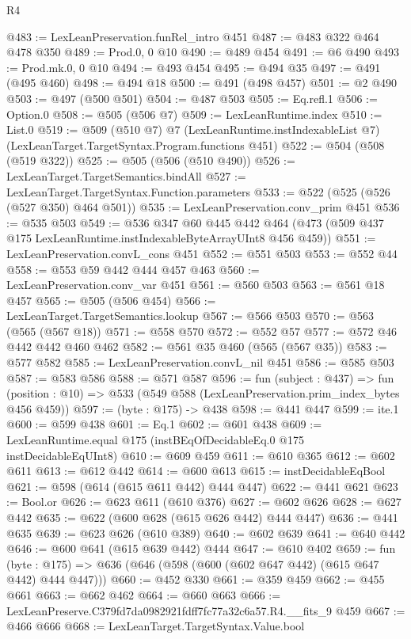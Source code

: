 \begin{lexlean}{R4}
\begin{coremodule}
@483 := LexLeanPreservation.funRel_intro @451
@487 := @483 @322 @464 @478 @350
@489 := Prod.{0, 0} @10
@490 := @489 @454
@491 := @6 @490
@493 := Prod.mk.{0, 0} @10
@494 := @493 @454
@495 := @494 @35
@497 := @491 (@495 @460)
@498 := @494 @18
@500 := @491 (@498 @457)
@501 := @2 @490
@503 := @497 (@500 @501)
@504 := @487 @503
@505 := Eq.refl.{1}
@506 := Option.{0}
@508 := @505 (@506 @7)
@509 := LexLeanRuntime.index
@510 := List.{0}
@519 := @509
    (@510 @7)
    @7
    (LexLeanRuntime.instIndexableList @7)
    (LexLeanTarget.TargetSyntax.Program.functions @451)
@522 := @504 (@508 (@519 @322))
@525 := @505 (@506 (@510 @490))
@526 := LexLeanTarget.TargetSemantics.bindAll
@527 := LexLeanTarget.TargetSyntax.Function.parameters
@533 := @522 (@525 (@526 (@527 @350) @464 @501))
@535 := LexLeanPreservation.conv_prim @451
@536 := @535 @503
@549 := @536
    @347
    @60
    @445
    @442
    @464
    (@473 (@509 @437 @175 LexLeanRuntime.instIndexableByteArrayUInt8 @456 @459))
@551 := LexLeanPreservation.convL_cons @451
@552 := @551 @503
@553 := @552 @44
@558 := @553 @59 @442 @444 @457 @463
@560 := LexLeanPreservation.conv_var @451
@561 := @560 @503
@563 := @561 @18 @457
@565 := @505 (@506 @454)
@566 := LexLeanTarget.TargetSemantics.lookup
@567 := @566 @503
@570 := @563 (@565 (@567 @18))
@571 := @558 @570
@572 := @552 @57
@577 := @572 @46 @442 @442 @460 @462
@582 := @561 @35 @460 (@565 (@567 @35))
@583 := @577 @582
@585 := LexLeanPreservation.convL_nil @451
@586 := @585 @503
@587 := @583 @586
@588 := @571 @587
@596 := fun (subject : @437) =>
  fun (position : @10) => @533 (@549 @588 (LexLeanPreservation.prim_index_bytes @456 @459))
@597 := (byte : @175) -> @438
@598 := @441 @447
@599 := ite.{1}
@600 := @599 @438
@601 := Eq.{1}
@602 := @601 @438
@609 := LexLeanRuntime.equal @175 (instBEqOfDecidableEq.{0} @175 instDecidableEqUInt8)
@610 := @609 @459
@611 := @610 @365
@612 := @602 @611
@613 := @612 @442
@614 := @600 @613
@615 := instDecidableEqBool
@621 := @598 (@614 (@615 @611 @442) @444 @447)
@622 := @441 @621
@623 := Bool.or
@626 := @623 @611 (@610 @376)
@627 := @602 @626
@628 := @627 @442
@635 := @622 (@600 @628 (@615 @626 @442) @444 @447)
@636 := @441 @635
@639 := @623 @626 (@610 @389)
@640 := @602 @639
@641 := @640 @442
@646 := @600 @641 (@615 @639 @442) @444
@647 := @610 @402
@659 := fun (byte : @175) => @636 (@646 (@598 (@600 (@602 @647 @442) (@615 @647 @442) @444 @447)))
@660 := @452 @330
@661 := @359 @459
@662 := @455 @661
@663 := @662 @462
@664 := @660 @663
@666 := LexLeanPreserve.C379fd7da0982921fdff7fc77a32c6a57.R4.__fits_9 @459
@667 := @466 @666
@668 := LexLeanTarget.TargetSyntax.Value.bool

\end{coremodule}
\end{lexlean}
